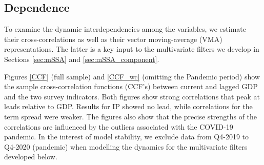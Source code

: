 \documentclass[11pt,a4paper]{article}
\begin{document}

\subsection{Dependence}
To examine the dynamic interdependencies among the variables, we estimate their cross-correlations as well as their vector moving-average (VMA) representations. The latter is a key input to the multivariate filters we develop in Sections \ref{sec:mSSA} and \ref{sec:mSSA_component}. 

Figures \ref{CCF} (full sample) and \ref{CCF_wc} (omitting the Pandemic period) show the sample cross-correlation functions (CCF's) between current and lagged GDP and the two survey indicators. Both figures show strong correlations that peak at leads relative to GDP. Results for IP showed no lead, while correlations for the term spread were weaker. The figures also show that the precise strengths of the correlations are influenced by the outliers associated with the COVID-19 pandemic. In the interest of model stability, we exclude data from Q4-2019 to Q4-2020 (pandemic) when modelling the dynamics for the multivariate filters developed below. 
\end{document}
